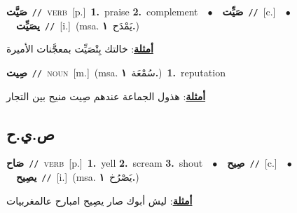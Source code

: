 \documentclass[10pt,a4paper,twoside]{article} %
\begin{document}
\begin{multicols}{2}
{\setlength\topsep{0pt}\textbf{\foreignlanguage{arabic}{صَيَّت}}\ {\color{gray}\texttt{//}\color{black}}\ \textsc{verb}\ [p.]\ \textbf{1.}~praise  \textbf{2.}~complement\ \ $\bullet$\ \ \setlength\topsep{0pt}\textbf{\foreignlanguage{arabic}{صَيِّت}}\ {\color{gray}\texttt{//}\color{black}}\ [c.]\ \ $\bullet$\ \ \setlength\topsep{0pt}\textbf{\foreignlanguage{arabic}{يصَيِّت}}\ {\color{gray}\texttt{//}\color{black}}\ [i.]\ \color{gray}(msa. \foreignlanguage{arabic}{يَمْدَح}~\foreignlanguage{arabic}{\textbf{١.}})\color{black}\  \begin{flushright}\color{gray}\foreignlanguage{arabic}{\textbf{\underline{\foreignlanguage{arabic}{أمثلة}}}: خالتك بِتْصَيِّت بمعجَّنات الأميرة}\end{flushright}\color{black}} \vspace{2mm}

{\setlength\topsep{0pt}\textbf{\foreignlanguage{arabic}{صِيت}}\ {\color{gray}\texttt{//}\color{black}}\ \textsc{noun}\ [m.]\ \color{gray}(msa. \foreignlanguage{arabic}{سُمْعَة}~\foreignlanguage{arabic}{\textbf{١.}})\color{black}\ \textbf{1.}~reputation\  \begin{flushright}\color{gray}\foreignlanguage{arabic}{\textbf{\underline{\foreignlanguage{arabic}{أمثلة}}}: هذول الجماعة عندهم صِيت منيح بين التجار}\end{flushright}\color{black}} \vspace{2mm}

\vspace{-3mm}
\subsection*{\color{blue}\foreignlanguage{arabic}{ص.ي.ح}\color{blue}{}} 

{\setlength\topsep{0pt}\textbf{\foreignlanguage{arabic}{صَاح}}\ {\color{gray}\texttt{//}\color{black}}\ \textsc{verb}\ [p.]\ \textbf{1.}~yell  \textbf{2.}~scream  \textbf{3.}~shout\ \ $\bullet$\ \ \setlength\topsep{0pt}\textbf{\foreignlanguage{arabic}{صِيح}}\ {\color{gray}\texttt{//}\color{black}}\ [c.]\ \ $\bullet$\ \ \setlength\topsep{0pt}\textbf{\foreignlanguage{arabic}{يصِيح}}\ {\color{gray}\texttt{//}\color{black}}\ [i.]\ \color{gray}(msa. \foreignlanguage{arabic}{يَصْرُخ}~\foreignlanguage{arabic}{\textbf{١.}})\color{black}\  \begin{flushright}\color{gray}\foreignlanguage{arabic}{\textbf{\underline{\foreignlanguage{arabic}{أمثلة}}}: ليش أبوك صار يصِيح امبارح عالمغربيات}\end{flushright}\color{black}} \vspace{2mm}


\end{multicols}
\end{document}
